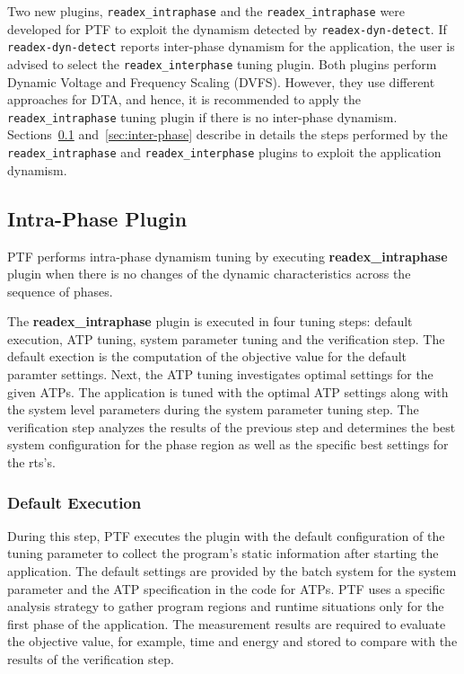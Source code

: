 Two new plugins, \texttt{readex\_intraphase} and the \texttt{readex\_intraphase} were developed for PTF to exploit the dynamism detected by \texttt{readex-dyn-detect}. If \texttt{readex-dyn-detect} reports inter-phase dynamism for the application, the user is advised to select the \texttt{readex\_interphase} tuning plugin. Both plugins perform Dynamic Voltage and Frequency Scaling (DVFS). However, they use different approaches for DTA, and hence, it is recommended to apply the \texttt{readex\_intraphase} tuning plugin if there is no inter-phase dynamism. Sections~\ref{sec:intra-phase} and~\ref{sec:inter-phase} describe in details the steps performed by the \texttt{readex\_intraphase} and \texttt{readex\_interphase} plugins to exploit the application dynamism.


\subsection{Intra-Phase Plugin} \label{sec:intra-phase}

PTF performs intra-phase dynamism tuning by executing \textbf{readex\_intraphase} plugin when there is no changes of the dynamic characteristics across the sequence of phases.  

The \textbf{readex\_intraphase} plugin is executed in four tuning steps: default execution, ATP tuning, system parameter tuning and the verification step. The default exection is the computation of the objective value for the default paramter settings. Next, the ATP tuning investigates optimal settings for the given ATPs. The application is tuned with the optimal ATP settings along with the system level parameters during the system parameter tuning step. The verification step analyzes the results of the previous step and determines the best system configuration for the phase region as well as the specific best settings for the rts's.

\subsubsection{Default Execution} \label{intra-default-execution} 

During this step, PTF executes the plugin with the default configuration of the tuning parameter to collect the program's static information after starting the application. The default settings are provided by the batch system for the system parameter and the ATP specification in the code for ATPs. PTF uses a specific analysis strategy to gather program regions and runtime situations only for the first phase of the application. The measurement results are required to evaluate the objective value, for example, time and energy and stored to compare with the results of the verification step.

